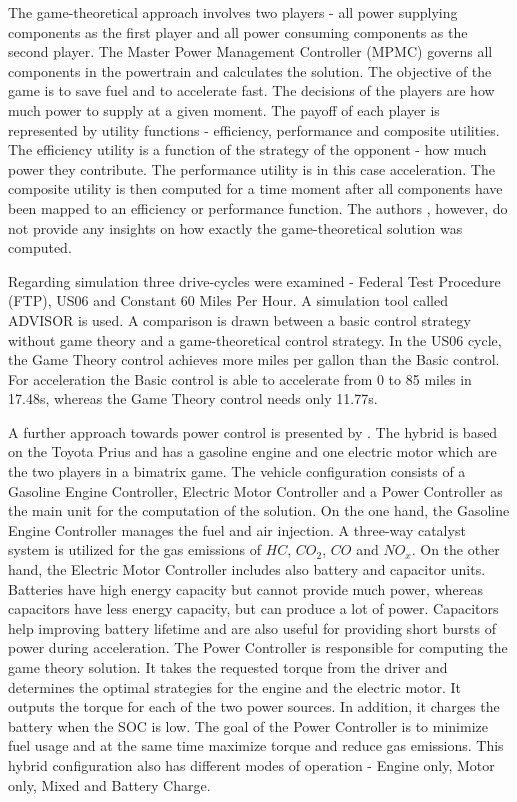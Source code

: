 The game-theoretical approach involves two players - all power supplying components as the first player and all power consuming components as the second player. The Master Power Management Controller (MPMC) governs all components in the powertrain and calculates the solution. The objective of the game is to save fuel and to accelerate fast. The decisions of the players are how much power to supply at a given moment. The payoff of each player is represented by utility functions - efficiency, performance and composite utilities. The efficiency utility is a function of the strategy of the opponent - how much power they contribute. The performance utility is in this case acceleration. The composite utility is then computed for a time moment after all components have been mapped to an efficiency or performance function. The authors \citet{gielniak2004power}, however, do not provide any insights on how exactly the game-theoretical solution was computed.

Regarding simulation three drive-cycles were examined - Federal Test Procedure (FTP), US06 and Constant 60 Miles Per Hour. A simulation tool called ADVISOR \citep{burch1999advisor} is used. A comparison is drawn between a basic control strategy without game theory and a game-theoretical control strategy. In the US06 cycle, the Game Theory control achieves more miles per gallon than the Basic control. For acceleration the Basic control is able to accelerate from 0 to 85 miles in 17.48s, whereas the Game Theory control needs only 11.77s.


A further approach towards power control is presented by \citet{chin2010design}. The hybrid is based on the Toyota Prius and has a gasoline engine and one electric motor which are the two players in a bimatrix game. The vehicle configuration consists of a Gasoline Engine Controller, Electric Motor Controller and a Power Controller as the main unit for the computation of the solution. On the one hand, the Gasoline Engine Controller manages the fuel and air injection. A three-way catalyst system is utilized for the gas emissions of $HC$, $CO_2$, $CO$ and $NO_x$. On the other hand, the Electric Motor Controller includes also battery and capacitor units. Batteries have high energy capacity but cannot provide much power, whereas capacitors have less energy capacity, but can produce a lot of power. Capacitors help improving battery lifetime and are also useful for providing short bursts of power during acceleration. The Power Controller is responsible for computing the game theory solution. It takes the requested torque from the driver and determines the optimal strategies for the engine and the electric motor. It outputs the torque for each of the two power sources. In addition, it charges the battery when the SOC is low. The goal of the Power Controller is to minimize fuel usage and at the same time maximize torque and reduce gas emissions. This hybrid configuration also has different modes of operation - Engine only, Motor only, Mixed and Battery Charge.


